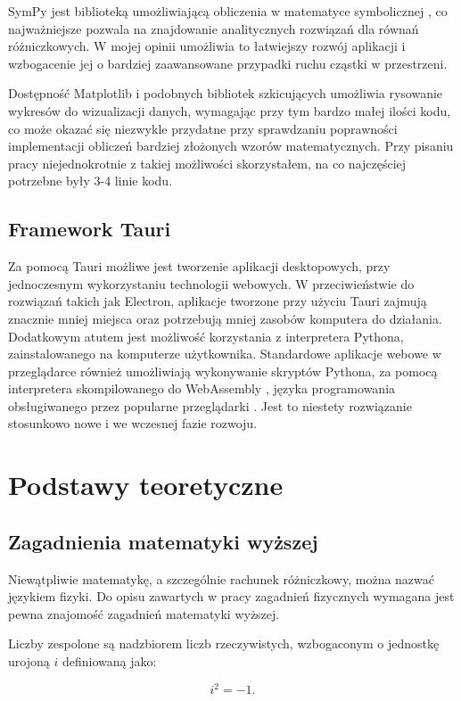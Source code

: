 \documentclass{SGGW-thesis}
\begin{document}
	SymPy jest biblioteką umożliwiającą obliczenia w matematyce symbolicznej \cite{sympy}, co najważniejsze pozwala na znajdowanie analitycznych rozwiązań dla równań różniczkowych. W mojej opinii umożliwia to łatwiejszy rozwój aplikacji i wzbogacenie jej o bardziej zaawansowane przypadki ruchu cząstki w przestrzeni.
	
	Dostępność Matplotlib i podobnych bibliotek szkicujących umożliwia rysowanie wykresów do wizualizacji danych, wymagając przy tym bardzo małej ilości kodu, co może okazać się niezwykle przydatne przy sprawdzaniu poprawności implementacji obliczeń bardziej złożonych wzorów matematycznych. Przy pisaniu pracy niejednokrotnie z takiej możliwości skorzystałem, na co najczęściej potrzebne były 3-4 linie kodu.
	
	\section{Framework Tauri}
	Za pomocą Tauri możliwe jest tworzenie aplikacji desktopowych, przy jednoczesnym wykorzystaniu technologii webowych. W przeciwieństwie do rozwiązań takich jak Electron, aplikacje tworzone przy użyciu Tauri zajmują znacznie mniej miejsca oraz potrzebują mniej zasobów komputera do działania. 
	Dodatkowym atutem jest możliwość korzystania z interpretera Pythona, zainstalowanego na komputerze użytkownika. Standardowe aplikacje webowe w przeglądarce również umożliwiają wykonywanie skryptów Pythona, za pomocą interpretera skompilowanego do WebAssembly \cite{python-webassembly}, języka programowania obsługiwanego przez popularne przeglądarki \cite{wasm}. Jest to niestety rozwiązanie stosunkowo nowe i we wczesnej fazie rozwoju.
	
\chapter{Podstawy teoretyczne}
	\section{Zagadnienia matematyki wyższej}
	Niewątpliwie matematykę, a szczególnie rachunek różniczkowy, można nazwać językiem fizyki. Do opisu zawartych w pracy zagadnień fizycznych wymagana jest pewna znajomość zagadnień matematyki wyższej.

	Liczby zespolone są nadzbiorem liczb rzeczywistych, wzbogaconym o jednostkę urojoną $i$ \cite{liczby zespolone} definiowaną jako: 
	
	\begin{equation}
	i^2=-1.
	\end{equation}
	
\end{document}
